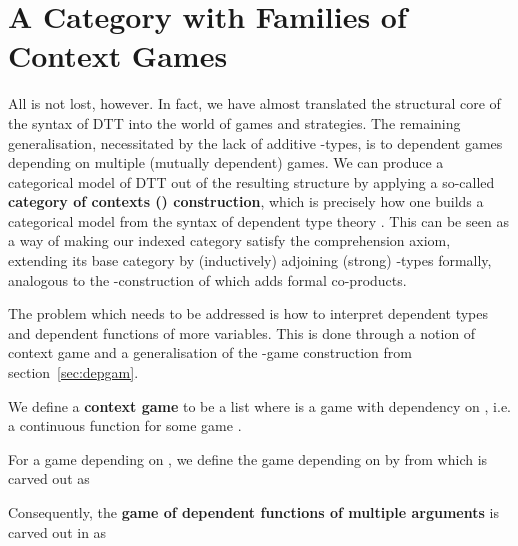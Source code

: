 \documentclass[runningheads,a4paper]{llncs}
\renewcommand{\emph}[1]{\textbf{#1}}
\begin{document}
\vspace{-8pt}
\section{A Category with Families of Context Games}\vspace{-7pt} \label{sec:ctxt}
All is not lost, however. In fact, we have almost translated the structural core of the syntax of \textsf{DTT} into the world of games and strategies. The remaining generalisation, necessitated by the lack of additive -types, is to dependent games depending on multiple (mutually dependent) games. We can produce a categorical model of \textsf{DTT} out of the resulting structure by applying a so-called \emph{category of contexts () construction}, which is precisely how one builds a categorical model from the syntax of dependent type theory \cite{hofmann1997syntax,pitts1995categorical}. This can be seen as a way of making our indexed category satisfy the comprehension axiom, extending its base category by (inductively) adjoining (strong) -types formally, analogous to the -construction of \cite{abramsky1998cbvgames} which adds formal co-products.

The problem which needs to be addressed is how to interpret dependent types and dependent functions of more variables. This is done through a notion of context game and a generalisation of the -game construction from section~\ref{sec:depgam}.
\vspace{-10pt}
\begin{definition}
We define a \emph{context game}  to be a list  where  is a game with dependency on , i.e. a continuous function  for some game .
\end{definition}
\vspace{-5pt}
\begin{definition}For a game  depending on , we define the game  depending on  by  from which  is carved out as\newline\resizebox{\linewidth}{!}{ \parbox{\linewidth}{\vspace{-10pt}
}}\vspace{-10pt}
\end{definition}
Consequently, the \emph{game of dependent functions of multiple arguments}  is carved out in  as\newline
\resizebox{\linewidth}{!}{ \parbox{\linewidth}{\vspace{-5pt}
}}\vspace{-5pt}
\end{document}
